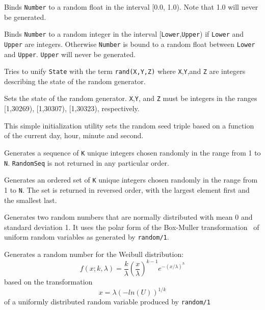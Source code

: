 
\begin{description}

%
Binds \texttt{Number} to a random float in the interval [0.0, 1.0).
Note that 1.0 will never be generated.

    Binds \texttt{Number} to a random integer in the interval
    [\texttt{Lower},\texttt{Upper}) if \texttt{Lower} and \texttt{Upper}
    are integers.  Otherwise \texttt{Number} is bound to a random float
    between \texttt{Lower} and \texttt{Upper}.  \texttt{Upper} will
    never be generated.

    Tries to unify \texttt{State} with the term \texttt{rand(X,Y,Z)}
    where \texttt{X},\texttt{Y},and \texttt{Z} are integers describing
    the state of the random generator.

    Sets the state of the random generator.  \texttt{X},\texttt{Y}, and
    \texttt{Z} must be integers in the ranges [1,30269), [1,30307),
    [1,30323), respectively.

This simple initialization utility sets the random seed triple based on a
function of the current day, hour, minute and second. 

    Generates a sequence of \texttt{K} unique integers chosen randomly
    in the range from 1 to \texttt{N}.  \texttt{RandomSeq} is not
    returned in any particular order.

    Generates an ordered set of \texttt{K} unique integers chosen
    randomly in the range from 1 to \texttt{N}.  The set is returned in
    reversed order, with the largest element first and the smallest
    last.

%
Generates two random numbers that are normally distributed with mean 0
and standard deviation 1.  It uses the polar form of the Box-Muller
transformation~\cite{BoxM58} of uniform random variables as generated by
{\tt random/1}.

%
Generates a random number for the Weibull distribution:
\[
  f(x;k,\lambda) = \frac{k}{\lambda}(\frac{x}{\lambda})^{k-1}e^{-(x/\lambda)^h}
\]
based on the transformation
\[
  x = \lambda(-ln(U))^{1/k}
\]
of a uniformly distributed random variable produced by {\tt random/1}


\end{description}
